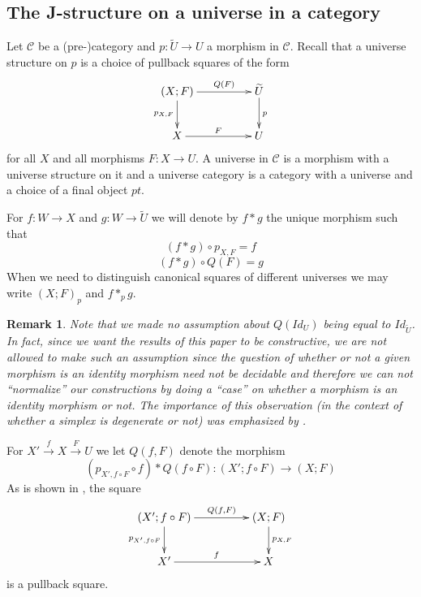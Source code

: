 \documentclass[12pt]{article}
\numberwithin{equation}{section}
\newenvironment{eq}{\begin{equation}}{\end{equation}}
\newtheorem{remark}[proposition]{Remark}
\newcommand{\llabel}[1]{\label{#1}}
\newcommand{\sr}{\rightarrow}
\newcommand{\wt}{\widetilde}
\begin{document}
\subsection{The J-structure on a universe in a category}
%
Let $\mathcal C$ be a (pre-)category and $p:\wt{U}\sr U$ a morphism in
$\mathcal C$. Recall that a universe structure on $p$ is a choice of pullback
squares of the form
%
$$
\begin{xy}
          \xymatrix@C=4pc{ (X;F) \ar[r]^-{Q(F)} \ar[d]_{p_{X,F}} & \wt{U}
            \ar[d]^{p}\\ X \ar[r]^{F} & U }
\end{xy}
$$
%
for all $X$ and all morphisms $F:X\sr U$. A universe in $\mathcal C$ is a
morphism with a universe structure on it and a universe category is a category
with a universe and a choice of a final object $pt$.

For $f:W\sr X$ and $g:W\sr \wt{U}$ we will denote by $f*g$ the unique morphism
such that
%
$$(f*g)\circ p_{X,F}=f$$
$$(f*g)\circ Q(F)=g$$
%
When we need to distinguish canonical squares of different universes we may
write $(X;F)_{p}$ and $f*_p g$.
%
\begin{remark}\rm
\llabel{2015.03.29.rm1} Note that we made no assumption about $Q(Id_U)$ being
equal to $Id_{\wt{U}}$. In fact, since we want the results of this paper to be
constructive, we are not allowed to make such an assumption since the question
of whether or not a given morphism is an identity morphism need not be
decidable and therefore we can not ``normalize'' our constructions by doing a
``case'' on whether a morphism is an identity morphism or not. The importance
of this observation (in the context of whether a simplex is degenerate or not)
was emphasized by \cite{BCH}.
\end{remark}
%
For $X'\stackrel{f}{\sr}X\stackrel{F}{\sr}U$ we let $Q(f,F)$ denote the
morphism
%
$$(p_{X',f\circ F}\circ f)*Q(f\circ F):(X';f\circ F)\sr (X;F)$$
%
As is shown in \cite{fromunivwithPi}, the square
%
\begin{eq}
\llabel{2015.04.06.l0.sq}
\begin{xy}
          \xymatrix@C=4pc{ (X';f\circ F) \ar[r]^-{Q(f,F)} \ar[d]_{p_{X',f\circ
                F}} & (X;F) \ar[d]^{p_{X,F}}\\ X' \ar[r]^{f} & X }
       \end{xy}
\end{eq}
%
is a pullback square.
\end{document}

